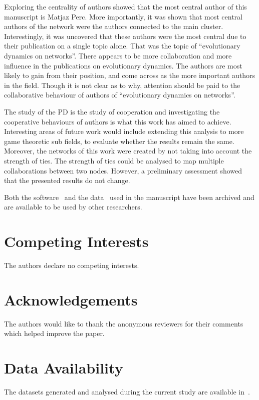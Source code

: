 \documentclass{article}
\theoremstyle{definition}
\begin{document}
Exploring the centrality of authors showed that the most central author of this
manuscript is Matjaz Perc. More importantly, it was shown that most central
authors of the network were the authors connected to the main cluster.
Interestingly, it was uncovered that these authors were the most central due to
their publication on a single topic alone. That was the topic of “evolutionary
dynamics on networks”. There appears to be more collaboration and more influence
in the publications on evolutionary dynamics. The authors are most likely to
gain from their position, and come across as the more important authors in the
field. Though it is not clear as to why, attention should be paid to the
collaborative behaviour of authors of “evolutionary dynamics on networks”.

The study of the PD is the study of cooperation and investigating the
cooperative behaviours of authors is what this work has aimed to achieve.
Interesting areas of future work would include extending this analysis to more
game theoretic sub fields, to evaluate whether the results remain the same.
Moreover, the networks of this work were created by not taking into account the
strength of ties. The strength of ties could be analysed to map multiple
collaborations between two nodes. However, a preliminary assessment showed that
the presented results do not change.

Both the software~\citep{nikoleta_2017} and the data~\citep{pd_data_2018} used in
the manuscript have been archived and are available to be used by other
researchers.

\section*{Competing Interests}

The authors declare no competing interests.

\section*{Acknowledgements}

The authors would like to thank the anonymous reviewers for their comments which
helped improve the paper.

\section*{Data Availability}

The datasets generated and analysed during the current study are available
in~\citep{auction_data_2018, anarchy_data_2018, pd_data_2018}.
\end{document}
